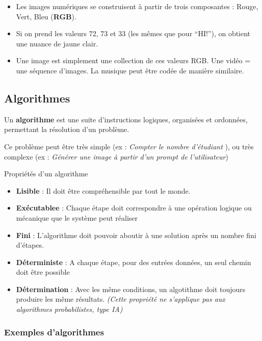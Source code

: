 \begin{itemize}
	\item Les images numériques se construisent à partir de trois composantes : Rouge, Vert, Bleu (\textbf{RGB}).
	\item Si on prend les valeurs 72, 73 et 33 (les mêmes que pour “HI!”), on obtient une nuance de jaune clair.
	\item Une image est simplement une collection de ces valeurs RGB. Une vidéo = une séquence d’images. La musique peut être codée de manière similaire.
\end{itemize}


\subsection{Algorithmes}

Un \textbf{algorithme} est une suite d’instructions logiques, organisées et ordonnées, permettant la résolution d'un problème.

Ce problème peut être très simple (ex : \textit{Compter le nombre d'étudiant} ), ou très complexe (ex : \textit{Générer une image à partir d'un prompt de l'utilisateur})

\begin{UPSTIinfor}{Propriétés d’un algorithme}
	\begin{itemize}
		\item \textbf{Lisible} : Il doit être compréhensible par tout le monde.
		\item \textbf{Exécutablee} : Chaque étape doit correspondre à une opération logique ou mécanique que le système peut réaliser
		\item \textbf{Fini} : L'algorithme doit pouvoir aboutir à une solution après un nombre fini d'étapes.
		\item \textbf{Déterministe} : A chaque étape, pour des entrées données, un seul chemin doit être possible
		\item \textbf{Détermination} : Avec les même conditions, un algotithme doit toujours produire les même résultats. \textit{(Cette propriété ne s'applique pas aux algorithmes probabilistes, type IA)}
	\end{itemize}
\end{UPSTIinfor}

\subsubsection{Exemples d’algorithmes}

